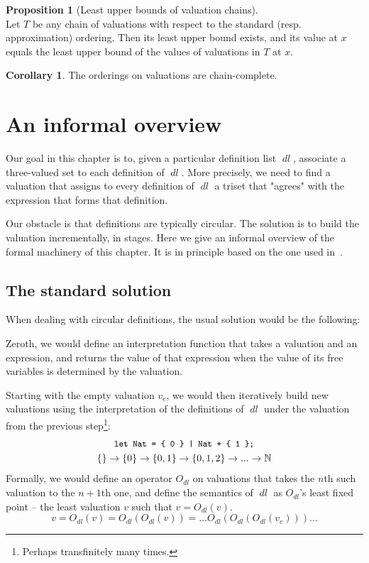 \documentclass[oneside,12pt]{book}
\theoremstyle{definition}
\newtheorem{corollary}[theorem]{Corollary}
\newtheorem{proposition}[theorem]{Proposition}
\theoremstyle{remark}
\newcommand\var[1]{\mathop{\mathit{#1}}\nolimits}
\newcommand{\dl}{\var{dl}}
\begin{document}
\begin{proposition}[Least upper bounds of valuation chains]
\label{leastUpperBoundsValuations} \hfill \\
  Let $T$ be any chain of valuations with respect to the standard
  (resp. approximation) ordering. Then its least upper bound exists, and its value
  at $x$ equals the least upper bound of the values of valuations in $T$ at $x$.
\end{proposition}

\begin{corollary}\label{valChainComplete}
  The orderings on valuations are chain-complete.
\end{corollary}

\section{An informal overview}
Our goal in this chapter is to, given a particular definition list $\dl$, associate
a three-valued set to each definition of $\dl$. More precisely, we need to
find a valuation that assigns to every definition of $\dl$ a triset that "agrees"
with the expression that forms that definition.

Our obstacle is that definitions are typically circular. The solution is to build
the valuation incrementally, in stages.
Here we give an informal overview of the formal machinery of this chapter.
It is in principle based on the one used in~\cite{WfSemBoolGrammar}.

\subsection{The standard solution}
When dealing with circular definitions, the usual solution would
be the following:

Zeroth, we would define an interpretation function that takes
a valuation and an expression, and returns the value of that expression
when the value of its free variables is determined by the valuation.

Starting with the empty valuation $v_e$, we would then iteratively build new valuations
using the interpretation of the definitions of $\dl$ under the valuation from
the previous step\footnote{Perhaps transfinitely many times.}:
\begin{gather*}
  \texttt{\small let Nat = \{ 0 \} | Nat + \{ 1 \};} \\
  \{\} \rightarrow \{ 0 \} \rightarrow \{ 0, 1 \} \rightarrow \{ 0, 1, 2 \}
    \rightarrow ... \rightarrow \mathbb{N}
\end{gather*}
Formally, we would define an operator $O_{\dl}$ on valuations that takes the $n$th
such valuation to the $n+1$th one, and define the semantics of $\dl$ as $O_{\dl}$'s
least fixed point -- the least valuation $v$ such that $v = O_{\dl}(v)$.
\[v = O_{\dl}(v) = O_{\dl}(O_{\dl}(v)) = ...O_{\dl}(O_{\dl}(O_{\dl}(v_e)))...\]
\end{document}
